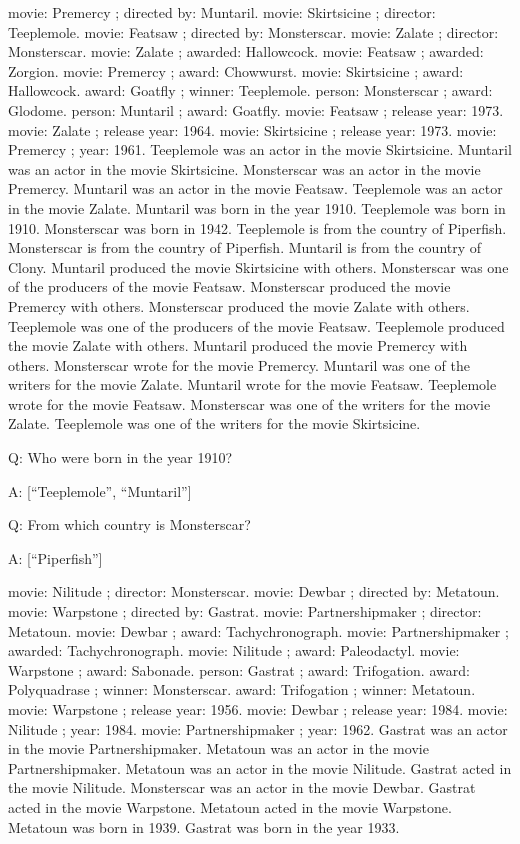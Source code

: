 \documentclass[
]{article}
\begin{document}
movie: Premercy ; directed by: Muntaril. movie: Skirtsicine ; director:
Teeplemole. movie: Featsaw ; directed by: Monsterscar. movie: Zalate ;
director: Monsterscar. movie: Zalate ; awarded: Hallowcock. movie:
Featsaw ; awarded: Zorgion. movie: Premercy ; award: Chowwurst. movie:
Skirtsicine ; award: Hallowcock. award: Goatfly ; winner: Teeplemole.
person: Monsterscar ; award: Glodome. person: Muntaril ; award: Goatfly.
movie: Featsaw ; release year: 1973. movie: Zalate ; release year: 1964.
movie: Skirtsicine ; release year: 1973. movie: Premercy ; year: 1961.
Teeplemole was an actor in the movie Skirtsicine. Muntaril was an actor
in the movie Skirtsicine. Monsterscar was an actor in the movie
Premercy. Muntaril was an actor in the movie Featsaw. Teeplemole was an
actor in the movie Zalate. Muntaril was born in the year 1910.
Teeplemole was born in 1910. Monsterscar was born in 1942. Teeplemole is
from the country of Piperfish. Monsterscar is from the country of
Piperfish. Muntaril is from the country of Clony. Muntaril produced the
movie Skirtsicine with others. Monsterscar was one of the producers of
the movie Featsaw. Monsterscar produced the movie Premercy with others.
Monsterscar produced the movie Zalate with others. Teeplemole was one of
the producers of the movie Featsaw. Teeplemole produced the movie Zalate
with others. Muntaril produced the movie Premercy with others.
Monsterscar wrote for the movie Premercy. Muntaril was one of the
writers for the movie Zalate. Muntaril wrote for the movie Featsaw.
Teeplemole wrote for the movie Featsaw. Monsterscar was one of the
writers for the movie Zalate. Teeplemole was one of the writers for the
movie Skirtsicine.

Q: Who were born in the year 1910?

A: {[}``Teeplemole'', ``Muntaril''{]}

Q: From which country is Monsterscar?

A: {[}``Piperfish''{]}

movie: Nilitude ; director: Monsterscar. movie: Dewbar ; directed by:
Metatoun. movie: Warpstone ; directed by: Gastrat. movie:
Partnershipmaker ; director: Metatoun. movie: Dewbar ; award:
Tachychronograph. movie: Partnershipmaker ; awarded: Tachychronograph.
movie: Nilitude ; award: Paleodactyl. movie: Warpstone ; award:
Sabonade. person: Gastrat ; award: Trifogation. award: Polyquadrase ;
winner: Monsterscar. award: Trifogation ; winner: Metatoun. movie:
Warpstone ; release year: 1956. movie: Dewbar ; release year: 1984.
movie: Nilitude ; year: 1984. movie: Partnershipmaker ; year: 1962.
Gastrat was an actor in the movie Partnershipmaker. Metatoun was an
actor in the movie Partnershipmaker. Metatoun was an actor in the movie
Nilitude. Gastrat acted in the movie Nilitude. Monsterscar was an actor
in the movie Dewbar. Gastrat acted in the movie Warpstone. Metatoun
acted in the movie Warpstone. Metatoun was born in 1939. Gastrat was
born in the year 1933.
\end{document}
